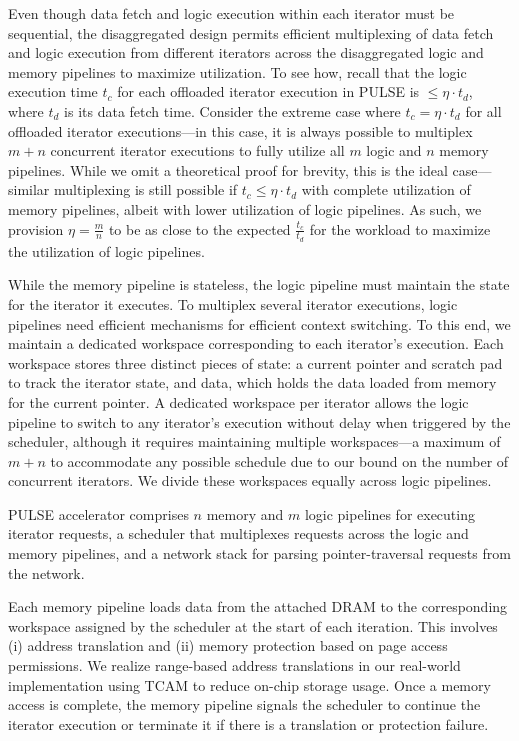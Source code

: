 Even though data fetch and logic execution within each iterator must be sequential, the disaggregated design permits efficient multiplexing of data fetch and logic execution from different iterators across the disaggregated logic and memory pipelines to maximize utilization. To see how, recall that the logic execution time $t_c$ for each offloaded iterator execution in PULSE is $\leq\eta\cdot t_d$, where $t_d$ is its data fetch time. Consider the extreme case where $t_c=\eta \cdot t_d$ for all offloaded iterator executions—in this case, it is always possible to multiplex $m+n$ concurrent iterator executions to fully utilize all $m$ logic and $n$ memory pipelines. While we omit a theoretical proof for brevity, this is the ideal case—similar multiplexing is still possible if $t_c\leq\eta\cdot t_d$ with complete utilization of memory pipelines, albeit with lower utilization of logic pipelines. As such, we provision $\eta=\frac{m}{n}$ to be as close to the expected $\frac{t_c}{t_d}$ for the workload to maximize the utilization of logic pipelines.

 While the memory pipeline is stateless, the logic pipeline must maintain the state for the iterator it executes. To multiplex several iterator executions, logic pipelines need efficient mechanisms for efficient context switching. To this end, we maintain a dedicated workspace corresponding to each iterator's execution. Each workspace stores three distinct pieces of state: a current pointer and scratch pad to track the iterator state, and data, which holds the data loaded from memory for the current pointer. A dedicated workspace per iterator allows the logic pipeline to switch to any iterator's execution without delay when triggered by the scheduler, although it requires maintaining multiple workspaces—a maximum of $m+n$ to accommodate any possible schedule due to our bound on the number of concurrent iterators. We divide these workspaces equally across logic pipelines.

 PULSE accelerator comprises $n$ memory and $m$ logic pipelines for executing iterator requests, a scheduler that multiplexes requests across the logic and memory pipelines, and a network stack for parsing pointer-traversal requests from the network.

 Each memory pipeline loads data from the attached DRAM to the corresponding workspace assigned by the scheduler at the start of each iteration. This involves (i) address translation and (ii) memory protection based on page access permissions. We realize range-based address translations in our real-world implementation using TCAM to reduce on-chip storage usage. Once a memory access is complete, the memory pipeline signals the scheduler to continue the iterator execution or terminate it if there is a translation or protection failure.


